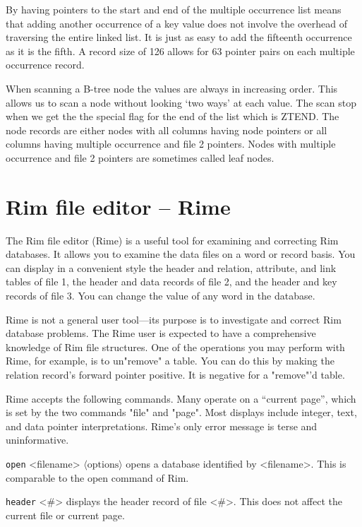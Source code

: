 \documentclass[11pt,a4paper]{report}
\def\opt#1{$\langle \mbox{#1} \rangle$}
\begin{document}
By having pointers to the start and end of the  multiple  occurrence
list  means  that  adding another occurrence of a key value does not
involve the overhead of traversing the entire linked  list.   It  is
just  as easy to add the fifteenth occurrence as it is the fifth.  A
record size of 126 allows for 63  pointer  pairs  on  each  multiple
occurrence record.
 
When scanning a B-tree node the  values  are  always  in  increasing
order.   This allows us to scan a node without looking `two ways' at
each value.  The scan stop when we get the the special flag for  the
end  of the list which is ZTEND. The node records are either nodes
with all columns  having  node  pointers  or  all  columns  having
multiple  occurrence  and  file  2 pointers.  Nodes with multiple
occurrence and file 2 pointers are sometimes called leaf nodes.
 
 
\section{Rim file editor -- {\bf Rime}}
 
The Rim file editor (Rime) is a useful tool for examining and
correcting Rim databases.  It allows you to examine the data files
on a word or record basis.  You can display in a convenient style
the header and relation, attribute, and link tables of file 1,
the header and data records of file 2, and the header and
key records of file 3.
You can change the value of any word in the database.
 
Rime is not a general user tool---its purpose is to investigate
and correct Rim database problems.  The Rime user is expected
to have a comprehensive knowledge of Rim file structures.
One of the operations you may perform with Rime, for example,
is to un"remove" a table.  You can do this by making the
relation record's forward pointer positive.  It is negative
for a "remove"'d table.
 
\bigskip
 
Rime accepts the following commands.
Many operate on a ``current page'', which is set by the two
commands "file" and "page".
Most displays include integer, text, and data pointer
interpretations.
Rime's only error message is terse and uninformative.
 
 
\verb|open| <filename> \opt{options}\>
opens a database identified by <filename>.  This is comparable
to the open command of Rim.
 
\verb|header| <\#>\>
displays the header record of file <\#>.
This does not affect the current file or current page.
 
\end{document}
